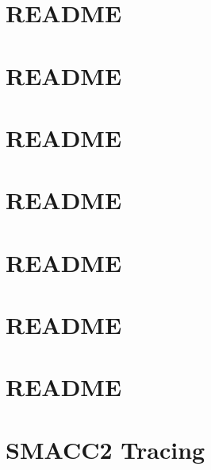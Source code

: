 \let\mypdfximage\pdfximage\def\pdfximage{\immediate\mypdfximage}\documentclass[twoside]{book}
\newcommand{\+}{\discretionary{\mbox{\scriptsize$\hookleftarrow$}}{}{}}
\begin{document}
\chapter{README}
\label{md_smacc_sm_reference_library_sm_branching_README}

\chapter{README}
\label{md_smacc_sm_reference_library_sm_dance_bot_README}

\chapter{README}
\label{md_smacc_sm_reference_library_sm_dance_bot_msgs_README}

\chapter{README}
\label{md_smacc_sm_reference_library_sm_dance_bot_strikes_back_README}

\chapter{README}
\label{md_smacc_sm_reference_library_sm_ferrari_README}

\chapter{README}
\label{md_smacc_sm_reference_library_sm_respira_1_README}

\chapter{README}
\label{md_smacc_sm_reference_library_sm_three_some_README}

\chapter{SMACC2 Tracing}
\label{md_tracing_ManualTracing}

\end{document}
